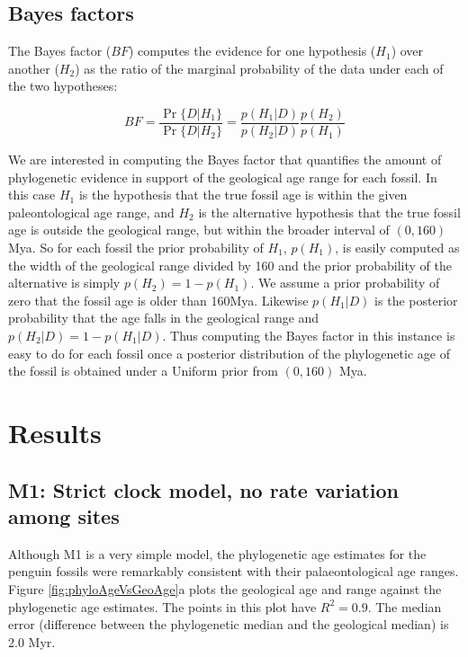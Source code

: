 \documentclass[11pt]{article}
\newcommand{\Mstrict}{{M1}}
\begin{document}
\subsection*{Bayes factors}

The Bayes factor ($BF$) computes the evidence for one hypothesis ($H_1$) over another ($H_2$) as the ratio of the marginal probability of the data under each of the two hypotheses:

\begin{equation}
BF = \frac{\Pr\{D|H_1\}}{\Pr\{D|H_2\}} = \frac{p(H_1|D)}{p(H_2|D)}\frac{p(H_2)}{p(H_1)}
\end{equation}

We are interested in computing the Bayes factor that quantifies the amount of phylogenetic evidence in support of the geological age range for each fossil. In this case $H_1$ is the hypothesis that the true fossil age is within the given paleontological age range, and $H_2$ is the alternative hypothesis that the true fossil age is outside the geological range, but within the broader interval of $(0,160)$ Mya. So for each fossil the prior probability of $H_1$, $p(H_1)$, is easily computed as the width of the geological range divided by 160 and the prior probability of the alternative is simply $p(H_2) = 1 - p(H_1)$. We assume a prior probability of zero that the fossil age is older than 160Mya. Likewise $p(H_1 | D)$ is the posterior probability that the age falls in the geological range and $p(H_2 | D) = 1 - p(H_1 | D)$. Thus computing the Bayes factor in this instance is easy to do for each fossil once a posterior distribution of the phylogenetic age of the fossil is obtained under a Uniform prior from $(0,160)$ Mya.

\section*{Results}


\subsection*{\Mstrict{}: Strict clock model, no rate variation among sites}
Although \Mstrict{} is a very simple model, the phylogenetic age estimates for the penguin fossils were remarkably consistent with their palaeontological age ranges. Figure \ref{fig:phyloAgeVsGeoAge}a plots the geological age and range against the phylogenetic age estimates. The points in this plot have $R^2 = 0.9$. The median error (difference between the phylogenetic median and the geological median) is 2.0 Myr.
\end{document}
